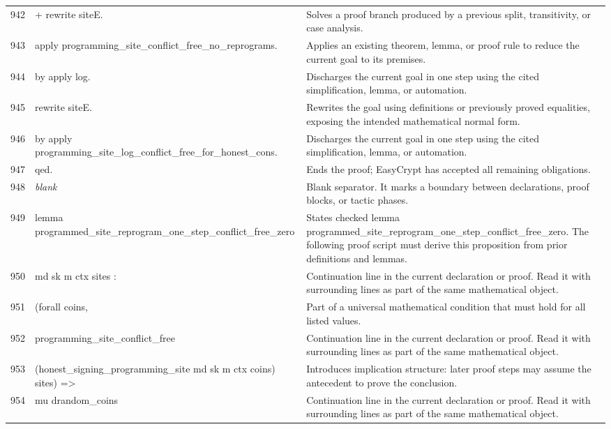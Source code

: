 \documentclass[10pt]{article}
\begin{document}
\begin{longtable}{r L{0.53\textwidth} L{0.37\textwidth}}
942 & {\ttfamily\scriptsize + rewrite siteE.} & Solves a proof branch produced by a previous split, transitivity, or case analysis. \\
943 & {\ttfamily\scriptsize   apply programming\_site\_conflict\_free\_no\_reprograms.} & Applies an existing theorem, lemma, or proof rule to reduce the current goal to its premises. \\
944 & {\ttfamily\scriptsize   by apply log.} & Discharges the current goal in one step using the cited simplification, lemma, or automation. \\
945 & {\ttfamily\scriptsize rewrite siteE.} & Rewrites the goal using definitions or previously proved equalities, exposing the intended mathematical normal form. \\
946 & {\ttfamily\scriptsize by apply programming\_site\_log\_conflict\_free\_for\_honest\_cons.} & Discharges the current goal in one step using the cited simplification, lemma, or automation. \\
947 & {\ttfamily\scriptsize qed.} & Ends the proof; EasyCrypt has accepted all remaining obligations. \\
948 & {\ttfamily\scriptsize \emph{blank}} & Blank separator.  It marks a boundary between declarations, proof blocks, or tactic phases. \\
949 & {\ttfamily\scriptsize lemma programmed\_site\_reprogram\_one\_step\_conflict\_free\_zero} & States checked lemma programmed\_site\_reprogram\_one\_step\_conflict\_free\_zero.  The following proof script must derive this proposition from prior definitions and lemmas. \\
950 & {\ttfamily\scriptsize   md sk m ctx sites :} & Continuation line in the current declaration or proof.  Read it with surrounding lines as part of the same mathematical object. \\
951 & {\ttfamily\scriptsize   (forall coins,} & Part of a universal mathematical condition that must hold for all listed values. \\
952 & {\ttfamily\scriptsize     programming\_site\_conflict\_free} & Continuation line in the current declaration or proof.  Read it with surrounding lines as part of the same mathematical object. \\
953 & {\ttfamily\scriptsize       (honest\_signing\_programming\_site md sk m ctx coins) sites) =>} & Introduces implication structure: later proof steps may assume the antecedent to prove the conclusion. \\
954 & {\ttfamily\scriptsize   mu drandom\_coins} & Continuation line in the current declaration or proof.  Read it with surrounding lines as part of the same mathematical object. \\

\end{longtable}
\end{document}
